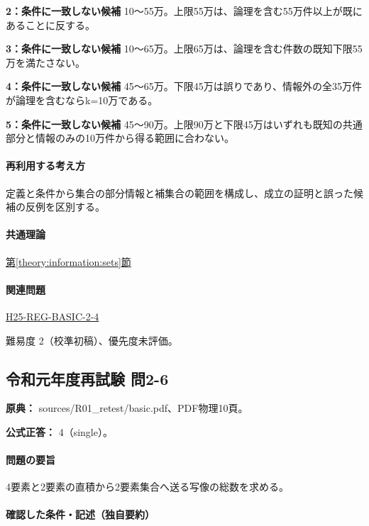 \noindent\textbf{2：条件に一致しない候補} 10〜55万。上限55万は、論理を含む55万件以上が既にあることに反する。\par

\noindent\textbf{3：条件に一致しない候補} 10〜65万。上限65万は、論理を含む件数の既知下限55万を満たさない。\par

\noindent\textbf{4：条件に一致しない候補} 45〜65万。下限45万は誤りであり、情報外の全35万件が論理を含むならk=\allowbreak{}10万である。\par

\noindent\textbf{5：条件に一致しない候補} 45〜90万。上限90万と下限45万はいずれも既知の共通部分と情報のみの10万件から得る範囲に合わない。\par

\paragraph{再利用する考え方} 定義と条件から集合の部分情報と補集合の範囲を構成し、成立の証明と誤った候補の反例を区別する。

\paragraph{共通理論} \hyperref[theory:information:sets]{第\ref*{theory:information:sets}節}

\paragraph{関連問題} \hyperref[q:h25-reg-basic-2-4]{H25-REG-BASIC-2-4}

\par 難易度 2（校準初稿）、優先度未評価。

\subsection{令和元年度再試験 問2-6}
\label{q:r01-ret-basic-2-6}

\noindent\textbf{原典：} sources/R01\_retest/basic.pdf、PDF物理10頁。

\textbf{公式正答：} 4（single）。

\paragraph{問題の要旨} 4要素と2要素の直積から2要素集合へ送る写像の総数を求める。

\paragraph{確認した条件・記述（独自要約）}\mbox{}\par

